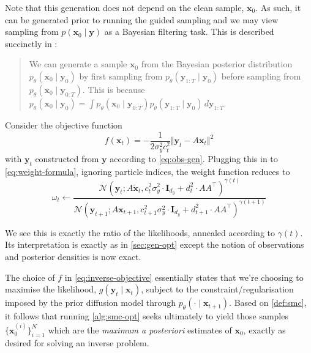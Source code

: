 Note that this generation does not depend on the clean sample, $\mathbf{x}_0$. As such,
it can be generated prior to running the guided sampling and we may view sampling from
$p(\mathbf{x}_0 \mid \mathbf{y})$ as a Bayesian filtering task. This is described succinctly in
\textcite{douDiffusionPosteriorSampling2023}:
\begin{quote}
    We can generate a sample $\mathbf{x}_0$ from the Bayesian posterior distribution
    $p_\theta(\mathbf{x}_0 \mid \mathbf{y}_0)$ by first sampling from
    $p_\theta(\mathbf{y}_{1:T} \mid \mathbf{y}_0)$ before sampling from
    $p_\theta(\mathbf{x}_0 \mid \mathbf{y}_{0:T})$. This is because
    $p_\theta(\mathbf{x}_0 \mid \mathbf{y}_0) = \int p_\theta(\mathbf{x}_0 \mid \mathbf{y}_{0:T})p_\theta(\mathbf{y}_{1:T} \mid \mathbf{y}_0)\, d\mathbf{y}_{1:T}$.
\end{quote}

\begin{proposition}
    Consider the objective function
    \begin{equation}
        f(\mathbf{x}_t) = -\frac{1}{2\sigma_y^2c_t^2}\Vert\mathbf{y}_t - A\mathbf{x}_t\Vert^2 \label{eq:inverse-objective}
    \end{equation}
    with $\mathbf{y}_t$ constructed from $\mathbf{y}$ according to \autoref{eq:obs-gen}.
    Plugging this in to \autoref{eq:weight-formula}, ignoring particle indices, the weight function
    reduces to
    \begin{equation}
        \omega_t \gets \frac{\mathcal{N}(\mathbf{y}_t; A\tilde{\mathbf{x}}_t, c_t^2\sigma_y^2\cdot \mathbf{I}_{d_y} + d_t^2\cdot AA^\top)^{\gamma(t)}}{\mathcal{N}(\mathbf{y}_{t+1}; A\mathbf{x}_{t+1}, c_{t+1}^2\sigma_y^2\cdot \mathbf{I}_{d_y} + d_{t+1}^2\cdot AA^\top)^{\gamma(t+1)}} \label{eq:weight-formula-inverse}
    \end{equation}
\end{proposition}

We see this is exactly the ratio of the likelihoods, annealed according to $\gamma(t)$. Its
interpretation is exactly as in \autoref{sec:gen-opt} except the notion of observations and posterior
densities is now exact.

\begin{remark}[MAP]
    The choice of $f$ in \autoref{eq:inverse-objective} essentially states that
    we're choosing to maximise the likelihood, $g(\mathbf{y}_t \mid \mathbf{x}_t)$, subject to the
    constraint/regularisation imposed by the prior diffusion model through
    $p_\theta(\cdot \mid \mathbf{x}_{t+1})$. Based on \ref{def:smc}, it follows that running
    \autoref{alg:smc-opt} seeks ultimately to yield those samples $\{\mathbf{x}_0^{(i)}\}_{i=1}^N$
    which are the \emph{maximum a posteriori} estimates of $\mathbf{x}_0$, exactly as desired for
    solving an inverse problem.
\end{remark}

